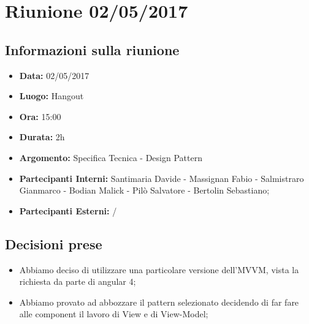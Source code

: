 \section{Riunione 02/05/2017}
  \subsection{Informazioni sulla riunione}
    \begin{itemize}
      \item \textbf{Data: }02/05/2017
      \item \textbf{Luogo: }Hangout
      \item \textbf{Ora: }15:00
      \item \textbf{Durata: }2h
      \item \textbf{Argomento: }Specifica Tecnica - Design Pattern
      \item \textbf{Partecipanti Interni: }Santimaria Davide - Massignan Fabio - Salmistraro Gianmarco - Bodian Malick - Pilò Salvatore - Bertolin Sebastiano;
      \item \textbf{Partecipanti Esterni: }/
    \end{itemize}
  \subsection{Decisioni prese}
		\begin{itemize}
			\item Abbiamo deciso di utilizzare una particolare versione dell'MVVM, vista la richiesta da parte di angular 4;
      \item Abbiamo provato ad abbozzare il pattern selezionato decidendo di far fare alle component il lavoro di View e di View-Model;
		\end{itemize}
